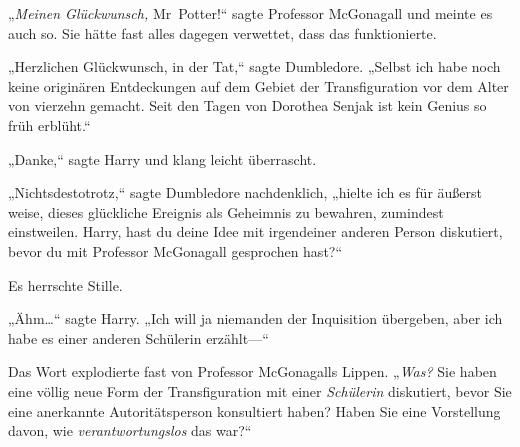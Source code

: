 „\emph{Meinen Glückwunsch,} Mr~Potter!“ sagte Professor McGonagall und meinte es auch so. Sie hätte fast alles dagegen verwettet, dass das funktionierte.

„Herzlichen Glückwunsch, in der Tat,“ sagte Dumbledore. „Selbst ich habe noch keine originären Entdeckungen auf dem Gebiet der Transfiguration vor dem Alter von vierzehn gemacht. Seit den Tagen von Dorothea Senjak ist kein Genius so früh erblüht.“%

„Danke,“ sagte Harry und klang leicht überrascht.

„Nichtsdestotrotz,“ sagte Dumbledore nachdenklich, „hielte ich es für äußerst weise, dieses glückliche Ereignis als Geheimnis zu bewahren, zumindest einstweilen. Harry, hast du deine Idee mit irgendeiner anderen Person diskutiert, bevor du mit Professor McGonagall gesprochen hast?“

Es herrschte Stille.

„Ähm…“ sagte Harry. „Ich will ja niemanden der Inquisition übergeben, aber ich habe es einer anderen Schülerin erzählt—“

Das Wort explodierte fast von Professor McGonagalls Lippen. „\emph{Was?} Sie haben eine völlig neue Form der Transfiguration mit einer \emph{Schülerin} diskutiert, bevor Sie eine anerkannte Autoritätsperson konsultiert haben? Haben Sie eine Vorstellung davon, wie \emph{verantwortungslos} das war?“

